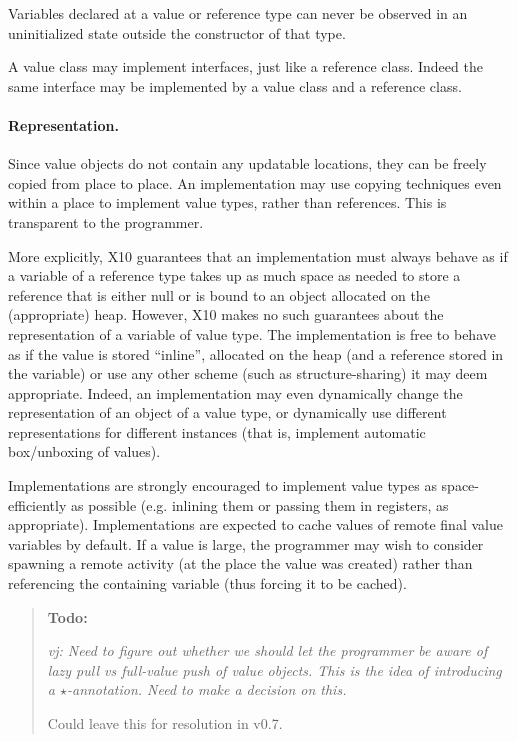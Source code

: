 \documentclass{article}
\def\ccfont{\sf}
\def\X10{{\ccfont X10}}
\newcommand \todo[1] {\begin{quotation}{\bf Todo:} {\footnotesize\em #1}\end{quotation}}
\begin{document}
Variables declared at a value or reference type can never be observed
in an uninitialized state outside the constructor of that type.

A value class may implement interfaces, just like a reference
class. Indeed the same interface may be implemented by a value class
and a reference class. 


\paragraph{Representation.}
Since value objects do not contain any updatable locations, they can
be freely copied from place to place. An implementation may use
copying techniques even within a place to implement value types,
rather than references. This is transparent to the programmer.

More explicitly, \X10{} guarantees that an implementation must always
behave as if a variable of a reference type takes up as much space as
needed to store a reference that is either null or is bound to an
object allocated on the (appropriate) heap. However, \X10{} makes no
such guarantees about the representation of a variable of value
type. The implementation is free to behave as if the value is stored
``inline'', allocated on the heap (and a reference stored in the
variable) or use any other scheme (such as structure-sharing) it may
deem appropriate. Indeed, an implementation may even dynamically
change the representation of an object of a value type, or dynamically
use different representations for different instances (that is,
implement automatic box/unboxing of values).

Implementations are strongly encouraged to implement value types as
space-efficiently as possible (e.g.{} inlining them or passing them in
registers, as appropriate).  Implementations are expected to cache
values of remote final value variables by default. If a value is
large, the programmer may wish to consider spawning a remote activity
(at the place the value was created) rather than referencing the
containing variable (thus forcing it to be cached).

\todo{vj: Need to figure out whether we should let the programmer be
aware of lazy pull vs full-value push of value objects. This is the
idea of introducing a $\star$-annotation. Need to make a decision on
this.

Could leave this for resolution in v0.7.
}
\end{document}
